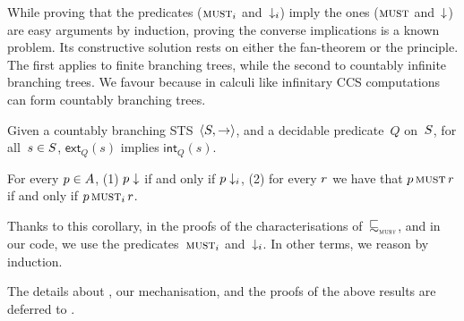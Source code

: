 While proving that the \intentional predicates ($\operatorname{\textsc{must}}_i$ and~$\downarrow_i$)
imply the \extensional ones ($\operatorname{\textsc{must}}$ and~$\downarrow$) are easy arguments by
induction, proving the converse implications is a known problem.
Its constructive solution rests on either the fan-theorem or the
\barinduction principle. The first applies to finite branching trees,
while the second to countably infinite branching trees. We favour
\barinduction because in calculi like infinitary CCS computations
can form countably branching trees.

\begin{proposition}%
  Given a countably branching STS~$\langle S, \to \rangle$, and a decidable predicate~$Q$
  on~$S$, for all~$s \in S$, $\mathsf{ext}_Q(s)$ implies
  $\mathsf{int}_Q(s).$
\end{proposition}

\begin{corollary}
  \label{cor:ext-int-eq-conv}
  \label{cor:ext-int-eq-must}
  For every $p \in A$,
  (1) $p \downarrow $ if and only if $p \downarrow_i$,
  (2) for every $r$ we have that $p \operatorname{\textsc{must}} r$ if
    and only if $p \operatorname{\textsc{must}}_i r$.
\end{corollary}
\noindent

Thanks to this corollary, in the proofs of the characterisations of~$\testleqS$,
and in our code, we use the predicates~$\operatorname{\textsc{must}}_i$ and~$\downarrow_i$. In other terms,
we reason by induction.

The details about \barinduction, our mechanisation,
and the proofs of the above results are deferred to .




